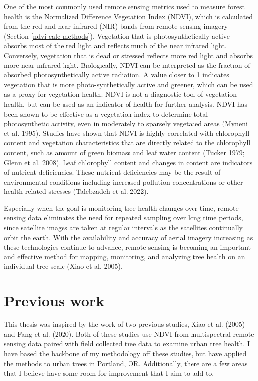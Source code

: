 \documentclass[12pt,twoside]{reedthesis}
\begin{document}
One of the most commonly used remote sensing metrics used to measure
forest health is the Normalized Difference Vegetation Index (NDVI),
which is calculated from the red and near infrared (NIR) bands from
remote sensing imagery (Section \ref{ndvi-calc-methods}). Vegetation
that is photosynthetically active absorbs most of the red light and
reflects much of the near infrared light. Conversely, vegetation that is
dead or stressed reflects more red light and absorbs more near infrared
light. Biologically, NDVI can be interpreted as the fraction of absorbed
photosynthetically active radiation. A value closer to 1 indicates
vegetation that is more photo-synthetically active and greener, which
can be used as a proxy for vegetation health. NDVI is not a diagnostic
tool of vegetation health, but can be used as an indicator of health for
further analysis. NDVI has been shown to be effective as a vegetation
index to determine total photosynthetic activity, even in moderately to
sparsely vegetated areas (Myneni et al. 1995). Studies have shown that NDVI is
highly correlated with chlorophyll content and vegetation
characteristics that are directly related to the chlorophyll content,
such as amount of green biomass and leaf water content (Tucker 1979; Glenn et al. 2008). Leaf chlorophyll content and changes in content are
indicators of nutrient deficiencies. These nutrient deficiencies may be
the result of environmental conditions including increased pollution
concentrations or other health related stresses (Talebzadeh et al. 2022).

Especially when the goal is monitoring tree health changes over time,
remote sensing data eliminates the need for repeated sampling over long
time periods, since satellite images are taken at regular intervals as
the satellites continually orbit the earth. With the availability and
accuracy of aerial imagery increasing as these technologies continue to
advance, remote sensing is becoming an important and effective method
for mapping, monitoring, and analyzing tree health on an individual tree
scale (Xiao et al. 2005).

\hypertarget{previous-work}{%
\section{Previous work}\label{previous-work}}

This thesis was inspired by the work of two previous studies, Xiao et al. (2005)
and Fang et al. (2020). Both of these studies use NDVI from multispectral remote
sensing data paired with field collected tree data to examine urban tree
health. I have based the backbone of my methodology off these studies,
but have applied the methods to urban trees in Portland, OR.
Additionally, there are a few areas that I believe have some room for
improvement that I aim to add to.
\end{document}
